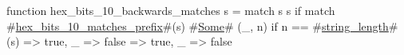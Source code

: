 function hex_bits_10_backwards_matches s = match s {
  s if match #\hyperref[sailRISCVzhexzybitszy10zymatcheszyprefix]{hex\_bits\_10\_matches\_prefix}#(s) {
    #\hyperref[sailRISCVzSome]{Some}# (_, n) if n == #\hyperref[sailRISCVzstringzylength]{string\_length}#(s) => true,
    _ => false
  } => true,
  _ => false
}
